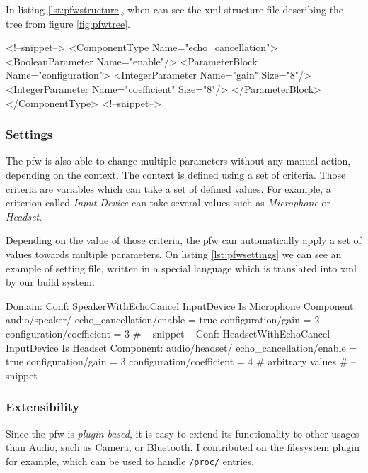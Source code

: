 In listing \ref{lst:pfwstructure}, when can see the \gls{xml} structure file
describing the tree from figure \ref{fig:pfwtree}.

\begin{code}[language=pfwXml, caption=Structure file example snippet, label=lst:pfwstructure]
<!--snippet-->
<ComponentType Name="echo_cancellation">
    <BooleanParameter Name="enable"/>
    <ParameterBlock Name="configuration">
        <IntegerParameter Name="gain" Size="8"/>
        <IntegerParameter Name="coefficient" Size="8"/>
    </ParameterBlock>
</ComponentType>
<!--snippet-->
\end{code}

\subsubsection{Settings}
The \gls{pfw} is also able to change multiple parameters without any manual action, depending on the context.
The context is defined using a set of criteria. Those criteria are variables which can take a set of defined values.
For example, a criterion called \emph{Input Device} can take several values such as \emph{Microphone} or \emph{Headset}.

Depending on the value of those criteria, the \gls{pfw} can automatically apply a set of values towards
multiple parameters.
On listing \ref{lst:pfwsettings} we can see an example of setting file, written in a special language
which is translated into \gls{xml} by our build system.

\begin{code}[language=pfwLang, caption=Settings file example, label=lst:pfwsettings]
Domain:
    Conf: SpeakerWithEchoCancel
        InputDevice Is Microphone
        Component: audio/speaker/
            echo_cancellation/enable = true
            configuration/gain = 2
            configuration/coefficient = 3
        # -- snippet --
    Conf: HeadsetWithEchoCancel
        InputDevice Is Headset
        Component: audio/headset/
            echo_cancellation/enable = true
            configuration/gain = 3
            configuration/coefficient = 4 # arbitrary values
        # -- snippet --
\end{code}

\subsubsection{Extensibility}
Since the \gls{pfw} is \emph{plugin-based}, it is easy to extend its functionality to other usages than Audio, such
as Camera, or Bluetooth. I contributed on the filesystem plugin for example, which can be used to handle \lstinline{/proc/} entries.
